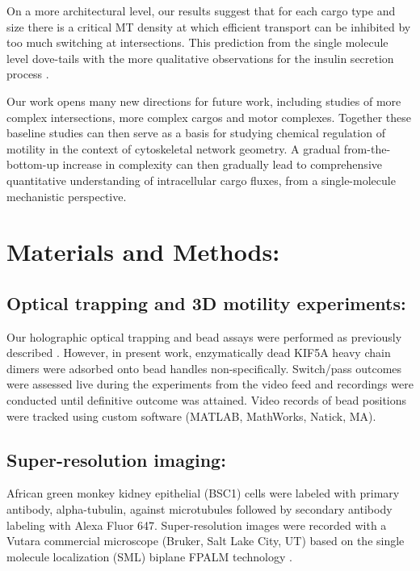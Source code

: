 On a more architectural level, our results suggest that for each cargo type and size there is a critical MT density at which efficient transport can be inhibited by too much switching at intersections. This prediction from the single molecule level dove-tails with the more qualitative observations for the insulin secretion process \cite{Zhu2015}.

Our work opens many new directions for future work, including studies of more complex intersections, more complex cargos and motor complexes. Together these baseline studies can then serve as a basis for studying chemical regulation of motility in the context of cytoskeletal network geometry. A gradual from-the-bottom-up increase in complexity can then gradually lead to comprehensive quantitative understanding of intracellular cargo fluxes, from a single-molecule mechanistic perspective.

\section{Materials and Methods:}

\subsection{Optical trapping and 3D motility experiments:}

Our holographic optical trapping and bead assays were performed as previously described \cite{Bergman2015}. However, in present work, enzymatically dead KIF5A heavy chain dimers were adsorbed onto bead handles non-specifically. Switch/pass outcomes were assessed live during the experiments from the video feed and recordings were conducted until definitive outcome was attained. Video records of bead positions were tracked using custom software (MATLAB, MathWorks, Natick, MA).

\subsection{Super-resolution imaging:}

African green monkey kidney epithelial (BSC1) cells were labeled with primary antibody, alpha-tubulin, against microtubules followed by secondary antibody labeling with Alexa Fluor 647. Super-resolution images were recorded with a Vutara commercial microscope (Bruker, Salt Lake City, UT) based on the single molecule localization (SML) biplane FPALM technology \cite{Juette2008,Mlodzianoski2009}.

